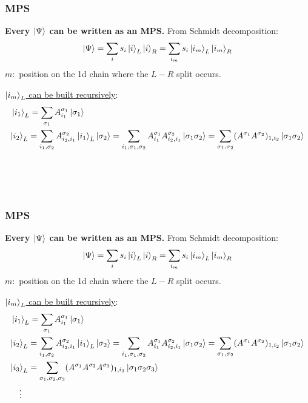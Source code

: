 \documentclass{beamer}
\theoremstyle{definition}
\begin{document}
\begin{frame}
	\frametitle{MPS}
	\textbf{Every $\ket{\Psi}$ can be written as an MPS.} From Schmidt decomposition:
	\begin{align*}
		\ket{\Psi} = \sum_{i} s_i \ket{i}_L \ket{i}_R = \sum_{i_m} s_i \ket{i_m}_L \ket{i_m}_R
	\end{align*}
	$m:$ position on the 1d chain where the $L-R$ split occurs. \\
	
	\vspace{15pt}
	
	\underline{$\ket{i_m}_L$ can be built recursively}:
	\begin{align*}
		&\ket{i_1}_L = \sum_{\sigma_1}A^{\sigma_1}_{i_1}\ket{\sigma_1}\\ 
		&\textcolor{black}{\ket{i_2}_L = \sum_{i_1,\sigma_2} A^{\sigma_2}_{i_2,i_1}  \ket{i_1}_L \ket{\sigma_2} = \sum_{i_1,\sigma_1,\sigma_2} A^{\sigma_1}_{i_1}   A^{\sigma_2}_{i_2,i_1} \ket{\sigma_1\sigma_2} = \sum_{\sigma_1,\sigma_2} (A^{\sigma_1}A^{\sigma_2})_{1,i_2} \ket{\sigma_1\sigma_2}}\\
		&\textcolor{white}{\ket{i_3}_L = \sum_{\sigma_1,\sigma_2,\sigma_3}(A^{\sigma_1}A^{\sigma_2}A^{\sigma_3})_{1,i_3} \ket{\sigma_1\sigma_2\sigma_3}}\\
		&\textcolor{white}{\quad\vdots}
	\end{align*}
\end{frame}


\begin{frame}
	\frametitle{MPS}
	\textbf{Every $\ket{\Psi}$ can be written as an MPS.} From Schmidt decomposition:
	\begin{align*}
		\ket{\Psi} = \sum_{i} s_i \ket{i}_L \ket{i}_R = \sum_{i_m} s_i \ket{i_m}_L \ket{i_m}_R
	\end{align*}
	$m:$ position on the 1d chain where the $L-R$ split occurs. \\
	
	\vspace{15pt}
	
	\underline{$\ket{i_m}_L$ can be built recursively}:
	\begin{align*}
		&\ket{i_1}_L = \sum_{\sigma_1}A^{\sigma_1}_{i_1}\ket{\sigma_1}\\ 
		&\textcolor{black}{\ket{i_2}_L = \sum_{i_1,\sigma_2} A^{\sigma_2}_{i_2,i_1}  \ket{i_1}_L \ket{\sigma_2} = \sum_{i_1,\sigma_1,\sigma_2} A^{\sigma_1}_{i_1}   A^{\sigma_2}_{i_2,i_1} \ket{\sigma_1\sigma_2} = \sum_{\sigma_1,\sigma_2} (A^{\sigma_1}A^{\sigma_2})_{1,i_2} \ket{\sigma_1\sigma_2}}\\
		&\textcolor{black}{\ket{i_3}_L = \sum_{\sigma_1,\sigma_2,\sigma_3}(A^{\sigma_1}A^{\sigma_2}A^{\sigma_3})_{1,i_3} \ket{\sigma_1\sigma_2\sigma_3}}\\
		&\textcolor{black}{\quad\vdots}
	\end{align*}
\end{frame}
\end{document}
